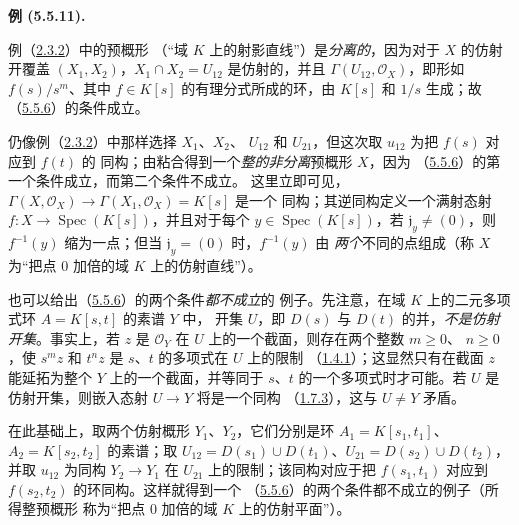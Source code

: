\documentclass[UTF8,fontset=none,11pt,oneside,openany]{ctexbook}
\newenvironment{examples}[1][]{%
  \par\medskip\noindent\textbf{例 (#1).}\ %
}{\par}
\let\EGAOriginalLabel\label
\renewcommand{\label}[1]{\phantomsection\EGAOriginalLabel{#1}}
\begin{document}
\begin{examples}[5.5.11]
\label{I.5.5.11-fr}
例（\hyperref[I.2.3.2-fr]{2.3.2}）中的预概形
（“域 $K$ 上的射影直线”）是\emph{分离的}，因为对于 $X$ 的仿射开覆盖
$(X_1,X_2)$，$X_1\cap X_2=U_{12}$ 是仿射的，并且
$\Gamma(U_{12},\mathscr{O}_X)$，即形如 $f(s)/s^m$、其中
$f\in K[s]$ 的有理分式所成的环，由 $K[s]$ 和 $1/s$ 生成；故
（\hyperref[I.5.5.6-fr]{5.5.6}）的条件成立。

仍像例（\hyperref[I.2.3.2-fr]{2.3.2}）中那样选择 $X_1$、$X_2$、
$U_{12}$ 和 $U_{21}$，但这次取 $u_{12}$ 为把 $f(s)$ 对应到 $f(t)$ 的
同构；由粘合得到一个\emph{整的非分离}预概形 $X$，因为
（\hyperref[I.5.5.6-fr]{5.5.6}）的第一个条件成立，而第二个条件不成立。
这里立即可见，
$\Gamma(X,\mathscr{O}_X)\to\Gamma(X_1,\mathscr{O}_X)=K[s]$ 是一个
同构；其逆同构定义一个满射态射
$f:X\to\operatorname{Spec}(K[s])$，并且对于每个
$y\in\operatorname{Spec}(K[s])$，若 $\mathfrak{j}_y\neq(0)$，则
$f^{-1}(y)$ 缩为一点；但当 $\mathfrak{j}_y=(0)$ 时，$f^{-1}(y)$ 由
\emph{两个}不同的点组成（称 $X$ 为“把点 $0$ 加倍的域 $K$ 上的仿射直线”）。

也可以给出（\hyperref[I.5.5.6-fr]{5.5.6}）的两个条件\emph{都不成立}的
例子。先注意，在域 $K$ 上的二元多项式环 $A=K[s,t]$ 的素谱 $Y$ 中，
开集 $U$，即 $D(s)$ 与 $D(t)$ 的并，\emph{不是仿射开集}。事实上，若 $z$ 是
$\mathscr{O}_Y$ 在 $U$ 上的一个截面，则存在两个整数 $m\geq0$、
$n\geq0$，使 $s^m z$ 和 $t^n z$ 是 $s$、$t$ 的多项式在 $U$ 上的限制
（\hyperref[I.1.4.1-fr]{1.4.1}）；这显然只有在截面 $z$ 能延拓为整个
$Y$ 上的一个截面，并等同于 $s$、$t$ 的一个多项式时才可能。若 $U$
是仿射开集，则嵌入态射 $U\to Y$ 将是一个同构
（\hyperref[I.1.7.3-fr]{1.7.3}），这与 $U\neq Y$ 矛盾。

在此基础上，取两个仿射概形 $Y_1$、$Y_2$，它们分别是环
$A_1=K[s_1,t_1]$、$A_2=K[s_2,t_2]$ 的素谱；取
$U_{12}=D(s_1)\cup D(t_1)$、$U_{21}=D(s_2)\cup D(t_2)$，并取
$u_{12}$ 为同构 $Y_2\to Y_1$ 在 $U_{21}$ 上的限制；该同构对应于把
$f(s_1,t_1)$ 对应到 $f(s_2,t_2)$ 的环同构。这样就得到一个
（\hyperref[I.5.5.6-fr]{5.5.6}）的两个条件都不成立的例子（所得整预概形
称为“把点 $0$ 加倍的域 $K$ 上的仿射平面”）。
\end{examples}
\end{document}
